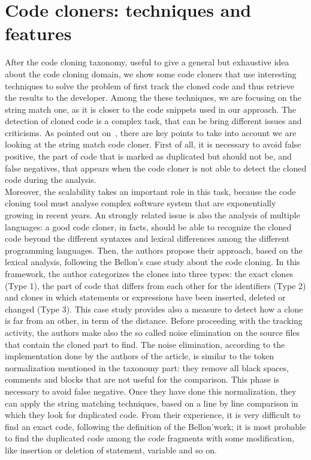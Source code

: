 \section{Code cloners: techniques and features}
After the code cloning taxonomy, useful to give a general but exhaustive idea about the code cloning domain, we show some code cloners that use interesting techniques to solve the problem of first track the cloned code and thus retrieve the results to the developer. Among the these techniques, we are focusing on the string match one, as it is closer to the code snippets used in our approach. The detection of cloned code is a complex task, that can be bring different issues and criticisms. As pointed out on~\cite{stephane_ducasse_effectiveness_2005}, there are key points to take into account we are looking at the string match code cloner. First of all, it is necessary to avoid false positive, the part of code that is marked as duplicated but should not be, and false negatives, that appears when the code cloner is not able to detect the cloned code during the analysis. \\
Moreover, the scalability takes an important role in this task, because the code cloning tool must analyse complex software system that are exponentially growing in recent years. An strongly related issue is also the analysis of multiple languages: a good code cloner, in facts, should be able to recognize the cloned code beyond the different syntaxes and lexical differences among the different programming languages. Then, the authors propose their approach, based on the lexical analysis, following the Bellon's case study about the code cloning. In this framework, the author categorizes the clones into three types: the exact clones (Type 1), the part of code that differs from each other for the identifiers (Type 2) and clones in which statements or expressions have been inserted, deleted or changed (Type 3). This case study provides also a measure to detect how a clone is far from an other, in term of the distance. Before proceeding with the tracking activity, the authors make also the so called noise elimination on the source files that contain the cloned part to find. The noise elimination, according to the implementation done by the authors of the article, is similar to the token normalization mentioned in the taxonomy part: they remove all black spaces, comments and blocks that are not useful for the comparison.
This phase is necessary to avoid false negative. Once they have done this normalization, they can apply the string matching techniques, based on a line by line comparison in which they look for duplicated code. From their experience, it is very difficult to find an exact code, following the definition of the Bellon'work; it is most probable to find the duplicated code among the code fragments with some modification, like insertion or deletion of statement, variable and so on. \\
